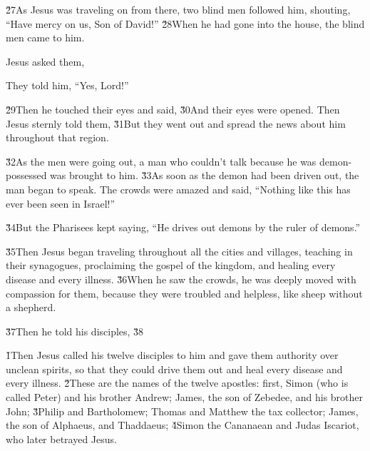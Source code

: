 \v{27}As Jesus was traveling on from there, two blind men followed him, shouting, ``Have mercy on us, Son of David!'' \v{28}When he had gone into the house, the blind men came to him.

Jesus asked them, 

They told him, ``Yes, Lord!''

\v{29}Then he touched their eyes and said,  \v{30}And their eyes were opened. Then Jesus sternly told them,  \v{31}But they went out and spread the news about him throughout that region.

\v{32}As the men were going out, a man who couldn't talk because he was demon-possessed was brought to him. \v{33}As soon as the demon had been driven out, the man began to speak. The crowds were amazed and said, ``Nothing like this has ever been seen in Israel!''

\v{34}But the Pharisees kept saying, ``He drives out demons by the ruler of demons.''

\v{35}Then Jesus began traveling throughout all the cities and villages, teaching in their synagogues, proclaiming the gospel of the kingdom, and healing every disease and every illness. \v{36}When he saw the crowds, he was deeply moved with compassion for them, because they were troubled and helpless, like sheep without a shepherd.

\v{37}Then he told his disciples,  \v{38}

\v{1}Then Jesus called his twelve disciples to him and gave them authority over unclean spirits, so that they could drive them out and heal every disease and every illness. \v{2}These are the names of the twelve apostles: first, Simon (who is called Peter) and his brother Andrew; James, the son of Zebedee, and his brother John; \v{3}Philip and Bartholomew; Thomas and Matthew the tax collector; James, the son of Alphaeus, and Thaddaeus; \v{4}Simon the Cananaean and Judas Iscariot, who later betrayed Jesus.

